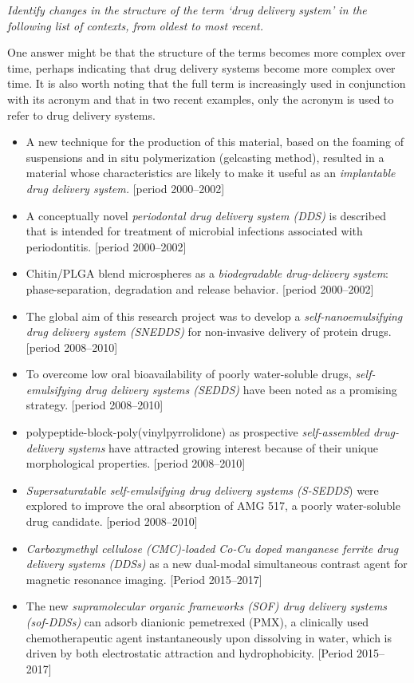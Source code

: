 \documentclass[output=paper]{langscibook}
\begin{document}
\begin{paperappendix}
\textit{Identify changes in the structure of the term ‘drug delivery system’ in the following list of contexts, from oldest to most recent.}

One answer might be that the structure of the terms becomes more complex over time, perhaps indicating that drug delivery systems become more complex over time. It is also worth noting that the full term is increasingly used in conjunction with its acronym and that in two recent examples, only the acronym is used to refer to drug delivery systems.

\begin{itemize}
\item A new technique for the production of this material, based on the foaming of suspensions and in situ polymerization (gelcasting method), resulted in a material whose characteristics are likely to make it useful as an \textit{implantable drug delivery system.} [period 2000–2002]
\item A conceptually novel \textit{periodontal drug delivery system (DDS)} is described that is intended for treatment of microbial infections associated with periodontitis. [period 2000–2002]
\item Chitin/PLGA blend microspheres as a \textit{biodegradable drug-delivery system}: phase-separation, degradation and release behavior. [period 2000–2002]
\item The global aim of this research project was to develop a \textit{self-nanoemulsifying drug delivery system (SNEDDS)} for non-invasive delivery of protein drugs. [period 2008–2010]
\item To overcome low oral bioavailability of poorly water-soluble drugs, \textit{self-emulsifying drug delivery systems (SEDDS)} have been noted as a promising strategy. [period 2008–2010]
\item polypeptide-block-poly(vinylpyrrolidone) as prospective \textit{self-assembled drug-delivery systems} have attracted growing interest because of their unique morphological properties. [period 2008–2010]
\item \textit{Supersaturatable self-emulsifying drug delivery systems (S-SEDDS}) were explored to improve the oral absorption of AMG 517, a poorly water-soluble drug candidate. [period 2008–2010]
\item \textit{Carboxymethyl cellulose (CMC)-loaded Co-Cu doped manganese ferrite drug delivery systems (DDSs)} as a new dual-modal simultaneous contrast agent for magnetic resonance imaging. [Period 2015–2017]
\item The new \textit{supramolecular organic frameworks (SOF) drug delivery systems (sof-DDSs)} can adsorb dianionic pemetrexed (PMX), a clinically used chemotherapeutic agent instantaneously upon dissolving in water, which is driven by both electrostatic attraction and hydrophobicity. [Period 2015–2017]

\end{itemize}
\end{paperappendix}
\end{document}
